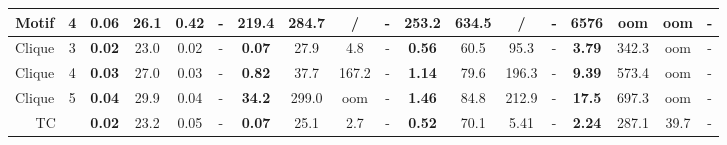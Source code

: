 \documentclass{vldb}
\begin{document}
\begin{sidewaystable}[!htp]
\begin{tabular}{c|c|c|c|c|c|c|c|c|c|c|c|c|c|c|c|c|c}
              Motif   & 4               & \textbf{0.06} & 26.1 & 0.42 & -    & \textbf{219.4} & 284.7 & /     & -     & \textbf{253.2} & 634.5 & /     & -    & \textbf{6576}  & oom   & oom & -   \\ \hline
              Clique  & 3               & \textbf{0.02} & 23.0 & 0.02 & -    & \textbf{0.07}  & 27.9  & 4.8   & -     & \textbf{0.56}  & 60.5  & 95.3  & -    & \textbf{3.79}  & 342.3 & oom & -   \\
              Clique  & 4               & \textbf{0.03} & 27.0 & 0.03 & -    & \textbf{0.82}  & 37.7  & 167.2 & -     & \textbf{1.14}  & 79.6  & 196.3 & -    & \textbf{9.39}  & 573.4 & oom & -   \\
              Clique  & 5               & \textbf{0.04} & 29.9 & 0.04 & -    & \textbf{34.2}  & 299.0 & oom   & -     & \textbf{1.46}  & 84.8  & 212.9 & -    & \textbf{17.5}  & 697.3 & oom & -   \\\hline
              \multicolumn{2}{c|}{TC}   & \textbf{0.02} & 23.2 & 0.05 & -    & \textbf{0.07}  & 25.1  & 2.7   & -     & \textbf{0.52}  & 70.1  & 5.41  & -    & \textbf{2.24}  & 287.1 & 39.7& -   \\\hline
       
       \end{tabular}
\end{sidewaystable}
\end{document}
